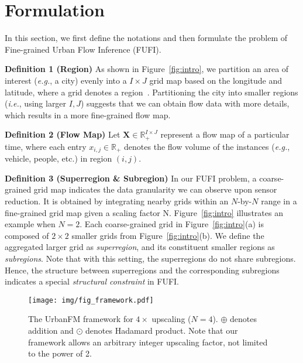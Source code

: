 \section{Formulation}\label{sec:form}
In this section, we first define the notations and then formulate the problem of Fine-grained Urban Flow Inference (FUFI).

\noindent\textbf{Definition 1 (Region)} As shown in Figure~\ref{fig:intro}, we partition an area of interest (\emph{e.g.}, a city) evenly into a $I\times J$ grid map based on the longitude and latitude, where a grid denotes a region~\cite{zhang2017deep}. Partitioning the city into smaller regions (\emph{i.e.}, using larger $I,J$) suggests that we can obtain flow data with more details, which results in a more fine-grained flow map.

\noindent\textbf{Definition 2 (Flow Map)} Let $\mathbf{X}\in\mathbb{R}^{I\times J}_{+}$ represent a flow map of a particular time, where each entry $x_{i,j}\in \mathbb{R}_{+}$ denotes the flow volume of the instances (\emph{e.g.}, vehicle, people, etc.) in region $(i,j)$.

\noindent\textbf{Definition 3 (Superregion \& Subregion)} In our FUFI problem, a coarse-grained grid map indicates the data granularity  we can observe upon sensor reduction. It is obtained by integrating nearby grids within an $N$-by-$N$ range in a fine-grained grid map given a scaling factor N. Figure~\ref{fig:intro} illustrates an example when $N=2$. Each coarse-grained grid in Figure~\ref{fig:intro}(a) is composed of $2\times 2$ smaller grids from Figure~\ref{fig:intro}(b). We define the aggregated larger grid as \textit{superregion}, and its constituent smaller regions as \textit{subregions}. Note that with this setting, the superregions do not share subregions. Hence, the structure between superregions and the corresponding subregions indicates a special \textit{structural constraint} in FUFI.


\begin{figure*}[!t]
	\centering
	\texttt{[image: img/fig\_framework.pdf]}
	\vspace{-1em}
	\caption{\label{fig:framework}The UrbanFM framework for $4\times$ upscaling ($N=4$). $\oplus$ denotes addition and $\odot$ denotes Hadamard product. Note that our framework allows an arbitrary integer upscaling factor, not limited to the power of 2.}
	\vspace{-1em}
\end{figure*}

